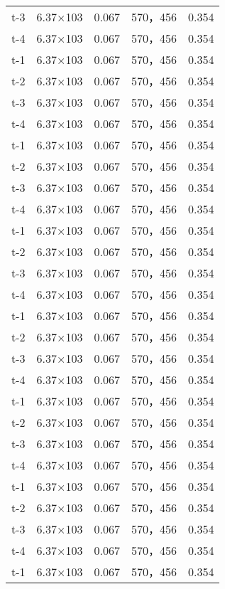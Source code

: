 \documentclass[../../main.tex]{subfiles}
\begin{document}
\begin{longtable}{ccccc}
t-3     &6.37×103       &0.067  &570，456        &0.354\\
t-4     &6.37×103       &0.067  &570，456        &0.354\\
t-1     &6.37×103       &0.067  &570，456        &0.354\\
t-2     &6.37×103       &0.067  &570，456        &0.354\\
t-3     &6.37×103       &0.067  &570，456        &0.354\\
t-4     &6.37×103       &0.067  &570，456        &0.354\\
t-1     &6.37×103       &0.067  &570，456        &0.354\\
t-2     &6.37×103       &0.067  &570，456        &0.354\\
t-3     &6.37×103       &0.067  &570，456        &0.354\\
t-4     &6.37×103       &0.067  &570，456        &0.354\\
t-1     &6.37×103       &0.067  &570，456        &0.354\\
t-2     &6.37×103       &0.067  &570，456        &0.354\\
t-3     &6.37×103       &0.067  &570，456        &0.354\\
t-4     &6.37×103       &0.067  &570，456        &0.354\\
t-1     &6.37×103       &0.067  &570，456        &0.354\\
t-2     &6.37×103       &0.067  &570，456        &0.354\\
t-3     &6.37×103       &0.067  &570，456        &0.354\\
t-4     &6.37×103       &0.067  &570，456        &0.354\\
t-1     &6.37×103       &0.067  &570，456        &0.354\\
t-2     &6.37×103       &0.067  &570，456        &0.354\\
t-3     &6.37×103       &0.067  &570，456        &0.354\\
t-4     &6.37×103       &0.067  &570，456        &0.354\\
t-1     &6.37×103       &0.067  &570，456        &0.354\\
t-2     &6.37×103       &0.067  &570，456        &0.354\\
t-3     &6.37×103       &0.067  &570，456        &0.354\\
t-4     &6.37×103       &0.067  &570，456        &0.354\\
t-1     &6.37×103       &0.067  &570，456        &0.354\\

\end{longtable}
\end{document}
